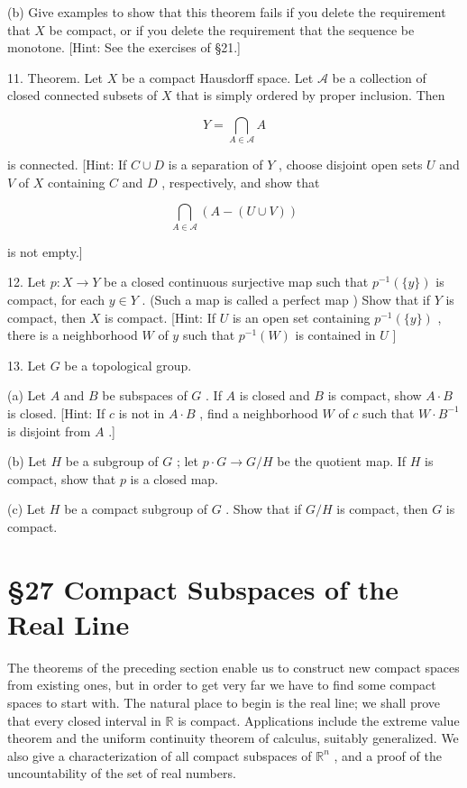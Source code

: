 (b) Give examples to show that this theorem fails if you delete the requirement that \(X\) be compact, or if you delete the requirement that the sequence be monotone. [Hint: See the exercises of §21.]

11. Theorem. Let \(X\) be a compact Hausdorff space. Let \(\mathcal{A}\) be a collection of closed connected subsets of \(X\) that is simply ordered by proper inclusion. Then

\[
Y = \mathop{\bigcap }\limits_{{A \in  \mathcal{A}}}A
\]

is connected. [Hint: If \(C \cup  D\) is a separation of \(Y\) , choose disjoint open sets \(U\) and \(V\) of \(X\) containing \(C\) and \(D\) , respectively, and show that

\[
\mathop{\bigcap }\limits_{{A \in  \mathcal{A}}}\left( {A - \left( {U \cup  V}\right) }\right)
\]

is not empty.]

12. Let \(p : X \rightarrow  Y\) be a closed continuous surjective map such that \({p}^{-1}\left( {\{ y\} }\right)\) is compact, for each \(y \in  Y\) . (Such a map is called a perfect map ) Show that if \(Y\) is compact, then \(X\) is compact. [Hint: If \(U\) is an open set containing \({p}^{-1}\left( {\{ y\} }\right)\) , there is a neighborhood \(W\) of \(y\) such that \({p}^{-1}\left( W\right)\) is contained in \(U\) ]

13. Let \(G\) be a topological group.

(a) Let \(A\) and \(B\) be subspaces of \(G\) . If \(A\) is closed and \(B\) is compact, show \(A \cdot  B\) is closed. [Hint: If \(c\) is not in \(A \cdot  B\) , find a neighborhood \(W\) of \(c\) such that \(W \cdot  {B}^{-1}\) is disjoint from \(A\) .]

(b) Let \(H\) be a subgroup of \(G\) ; let \(p \cdot  G \rightarrow  G/H\) be the quotient map. If \(H\) is compact, show that \(p\) is a closed map.

(c) Let \(H\) be a compact subgroup of \(G\) . Show that if \(G/H\) is compact, then \(G\) is compact.

\section*{§27 Compact Subspaces of the Real Line}

The theorems of the preceding section enable us to construct new compact spaces from existing ones, but in order to get very far we have to find some compact spaces to start with. The natural place to begin is the real line; we shall prove that every closed interval in \(\mathbb{R}\) is compact. Applications include the extreme value theorem and the uniform continuity theorem of calculus, suitably generalized. We also give a characterization of all compact subspaces of \({\mathbb{R}}^{n}\) , and a proof of the uncountability of the set of real numbers.

